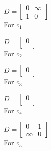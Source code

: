 \documentclass[12pt]{article}
\begin{document}
\begin{minipage}[t]{0.3\textwidth}
	\begin{center}
            $D = \begin{bmatrix}
            0 & \infty\\
            1 & 0
            \end{bmatrix}$
		\\
		\vspace{20px}
		For $v_1$
	\end{center}
\end{minipage}\hfill
\begin{minipage}[t]{0.3\textwidth}
	\begin{center}
            $D = \begin{bmatrix}
            0\\
            \end{bmatrix}$
            \\
		\vspace{20px}
		For $v_2$
	\end{center}    
\end{minipage}\hfill
\begin{minipage}[t]{0.3\textwidth}
	\begin{center}
            $D = \begin{bmatrix}
            0\\
            \end{bmatrix}$
            \\
		\vspace{20px}
		For $v_3$
	\end{center}
\end{minipage}

\vspace{30px}

\begin{minipage}[t]{0.45\textwidth}
	\begin{center}
            $D = \begin{bmatrix}
            0\\
            \end{bmatrix}$
		\\
		\vspace{20px}
		For $v_4$
	\end{center}
\end{minipage}\hfill
\begin{minipage}[t]{0.45\textwidth}
	\begin{center}
            $D = \begin{bmatrix}
            0 & 1\\
            \infty & 0
            \end{bmatrix}$
            \\
		\vspace{20px}
		For $v_5$
	\end{center}
\end{minipage}\hfill
\end{document}
